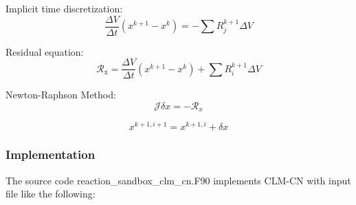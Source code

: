 \documentclass[12pt, a4paper]{article}
\begin{document}
Implicit time discretization:
\begin{equation}
\frac{\Delta V}{\Delta t} \left(x^{k+1} - x^k\right) = - \sum R_j^{k+1} \Delta V
\end{equation}

Residual equation:
\begin{equation}
\mathcal{R}_\text{x} = \frac{\Delta V}{\Delta t} \left(x^{k+1} - x^k\right)  + \sum R_i^{k+1} \Delta V
\end{equation}

Newton-Raphson Method:
\begin{equation}
\mathcal{J} \delta x = -\mathcal{R}_x
\end{equation}

\begin{equation}
x^{k+1,i+1} = x^{k+1,i}+ \delta x
\end{equation}

\subsubsection{Implementation}
The source code reaction\_sandbox\_clm\_cn.F90 implements CLM-CN with input file like the following: 
\end{document}
